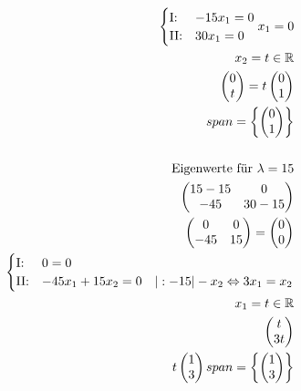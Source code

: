 \begin{align*}
\begin{cases}
        \text{I:\@} & -15x_1 = 0 \\
        \text{II:\@} & 30x_1 = 0 
    \end{cases}
    x_1 = 0 \\
    x_2 = t \in \mathbb{R}\\
    \begin{pmatrix}
        0 \\ t
    \end{pmatrix} = t \begin{pmatrix}
        0 \\ 1
    \end{pmatrix} \\
    span = \left\{\begin{pmatrix}
        0 \\ 1
    \end{pmatrix}\right\}\\\\
    \text{Eigenwerte für } \lambda = 15 \\
    \begin{pmatrix}
        15 - 15 & 0 \\
        -45 & 30 - 15
    \end{pmatrix} \\
    \begin{pmatrix}
        0 & 0 \\
        -45 & 15
    \end{pmatrix} = \begin{pmatrix}
        0 \\ 0
    \end{pmatrix} \\
    \begin{cases}
        \text{I:\@} & 0 = 0 \\
        \text{II:\@} & -45x_1 + 15x_2 = 0 \quad | :-15 | -x_2 \Leftrightarrow 3x_1 = x_2
    \end{cases} \\
    x_1 = t \in \mathbb{R} \\
    \begin{pmatrix}
        t \\
        3t
    \end{pmatrix} \\
    t \begin{pmatrix}
        1 \\ 3
    \end{pmatrix}
    span = \left\{\begin{pmatrix}
        1 \\ 3
    \end{pmatrix}\right\}
\end{align*}